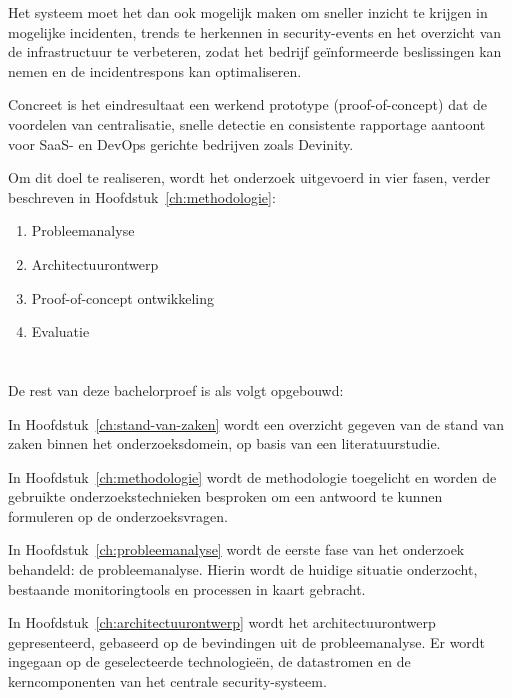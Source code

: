 Het systeem moet het dan ook mogelijk maken om sneller inzicht te krijgen in mogelijke incidenten, trends te herkennen in security-events en het overzicht van de infrastructuur te verbeteren, zodat het bedrijf geïnformeerde beslissingen kan nemen en de incidentrespons kan optimaliseren.

Concreet is het eindresultaat een werkend prototype (proof-of-concept) dat de voordelen van centralisatie, snelle detectie en consistente rapportage aantoont voor SaaS- en DevOps gerichte bedrijven zoals Devinity.

Om dit doel te realiseren, wordt het onderzoek uitgevoerd in vier fasen, verder beschreven in Hoofdstuk~\ref{ch:methodologie}:

\begin{enumerate}
    \item Probleemanalyse
    \item Architectuurontwerp
    \item Proof-of-concept ontwikkeling
    \item Evaluatie
\end{enumerate} 

\section{}
\label{sec:opzet-bachelorproef}


De rest van deze bachelorproef is als volgt opgebouwd:

In Hoofdstuk~\ref{ch:stand-van-zaken} wordt een overzicht gegeven van de stand van zaken binnen het onderzoeksdomein, op basis van een literatuurstudie.

In Hoofdstuk~\ref{ch:methodologie} wordt de methodologie toegelicht en worden de gebruikte onderzoekstechnieken besproken om een antwoord te kunnen formuleren op de onderzoeksvragen.

In Hoofdstuk~\ref{ch:probleemanalyse} wordt de eerste fase van het onderzoek behandeld: de probleemanalyse. Hierin wordt de huidige situatie onderzocht, bestaande monitoringtools en processen in kaart gebracht.

In Hoofdstuk~\ref{ch:architectuurontwerp} wordt het architectuurontwerp gepresenteerd, gebaseerd op de bevindingen uit de probleemanalyse. Er wordt ingegaan op de geselecteerde technologieën, de datastromen en de kerncomponenten van het centrale security-systeem.

